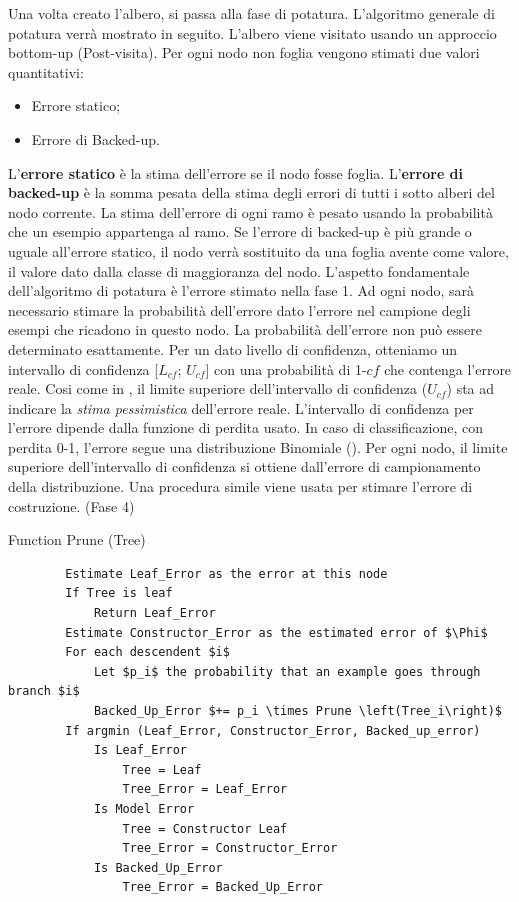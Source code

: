 Una volta creato l'albero, si passa alla fase di potatura. L'algoritmo generale di potatura verrà mostrato in seguito. L'albero viene visitato usando un approccio bottom-up (Post-visita). Per ogni nodo non foglia vengono stimati due valori quantitativi: 
\begin{itemize}
	\item Errore statico;
	\item Errore di Backed-up.
\end{itemize}
L'\textbf{errore statico} è la stima dell'errore se il nodo fosse foglia.
L'\textbf{errore di backed-up} è la somma pesata della stima degli errori di tutti i sotto alberi del nodo corrente. La stima dell'errore di ogni ramo è pesato usando la probabilità che un esempio appartenga al ramo. Se l'errore di backed-up è più grande o uguale all'errore statico, il nodo verrà sostituito da una foglia avente come valore, il valore dato dalla classe di maggioranza del nodo. L'aspetto fondamentale dell'algoritmo di potatura è l'errore stimato nella fase 1. Ad ogni nodo, sarà necessario stimare la probabilità dell'errore dato l'errore nel campione degli esempi che ricadono in questo nodo. La probabilità dell'errore non può essere determinato esattamente. Per un dato livello di confidenza, otteniamo un intervallo di confidenza [$L_{cf}$; $U_{cf}$] con una probabilità di 1-$cf$ che contenga l'errore reale. Cosi come in \cite{Quinlan:1993a}, il limite superiore dell'intervallo di confidenza ($U_{cf}$) sta ad indicare la \emph{stima pessimistica} dell'errore reale. L'intervallo di confidenza per l'errore dipende dalla funzione di perdita usato. In caso di classificazione, con perdita 0-1, l'errore segue una distribuzione Binomiale (\cite{mitchellbook}). Per ogni nodo, il limite superiore dell'intervallo di confidenza si ottiene dall'errore di campionamento della distribuzione.
Una procedura simile viene usata per stimare l'errore di costruzione. (Fase 4)


\begin{algorithm}
	\caption{Function Prune (Tree)}
	\begin{lstlisting}
		Estimate Leaf_Error as the error at this node
		If Tree is leaf 
			Return Leaf_Error
		Estimate Constructor_Error as the estimated error of $\Phi$
		For each descendent $i$
			Let $p_i$ the probability that an example goes through branch $i$
			Backed_Up_Error $+= p_i \times Prune \left(Tree_i\right)$
		If argmin (Leaf_Error, Constructor_Error, Backed_up_error)
			Is Leaf_Error
				Tree = Leaf
				Tree_Error = Leaf_Error
			Is Model Error
				Tree = Constructor Leaf
				Tree_Error = Constructor_Error
			Is Backed_Up_Error
				Tree_Error = Backed_Up_Error
	\end{lstlisting}
\end{algorithm}

